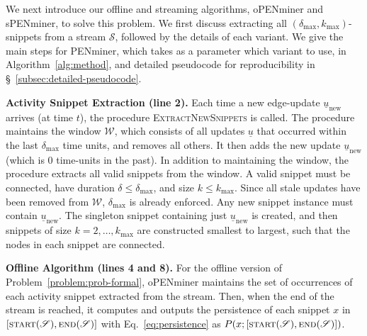 \documentclass[sigconf]{acmart}
\newcommand{\ul}{\underline}
\newcommand{\method}{PENminer\xspace}
\newcommand{\methodOffline}{oPENminer\xspace}
\newcommand{\methodOnline}{sPENminer\xspace}
\newcommand{\update}{\ul{u}}
\newcommand{\newUpdate}{\update_{\text{new}}}
\newcommand{\timestamp}{t}
\newcommand{\stream}{\mathscr{S}}
\newcommand{\streamStart}{\textsc{start}(\stream)}
\newcommand{\streamEnd}{\textsc{end}(\stream)}
\newcommand{\pattern}{x}
\newcommand{\patternSize}{k}
\newcommand{\duration}{\delta}
\newcommand{\window}{\mathscr{W}}
\newcommand{\maxDuration}{\duration_{\max}}
\newcommand{\maxSize}{\patternSize_{\max}}
\newcommand{\persistence}{P}
\begin{document}
We next introduce our offline and streaming algorithms, \methodOffline and \methodOnline, to solve this problem. 
We first discuss extracting all $(\maxDuration,\maxSize)$-snippets from a stream $\stream$, followed by the details of each variant.
We give the main steps for \method, which takes as a parameter which variant to use, in Algorithm~\ref{alg:method}, and detailed pseudocode for reproducibility in \S~\ref{subsec:detailed-pseudocode}.





\vspace{0.1cm}
\label{subsubsec:pattern-extraction}
\noindent \textbf{Activity Snippet Extraction (line 2).} \label{subsubsec:alg-extract-patterns} Each time a new edge-update $\newUpdate$ arrives (at time $\timestamp$), the procedure \textsc{ExtractNewSnippets} is called. The procedure maintains the window $\window$, which consists of all updates $\update$ 
that occurred within the last $\maxDuration$ time units, and removes all others. 
It then adds the new update $\newUpdate$ (which is 0 time-units in the past). In addition to maintaining the window, the procedure extracts all valid snippets from the window. A valid snippet must be connected, have duration $\duration \leq \maxDuration$, and size $\patternSize \leq \maxSize$.  Since all stale updates have been removed from $\window$, $\maxDuration$ is already enforced. Any new snippet instance must contain $\newUpdate$.  
The singleton snippet containing just $\newUpdate$ is created, and then snippets of size $\patternSize = 2, \dots, \maxSize$ are constructed smallest to largest, such that the nodes in each snippet are connected.



\vspace{0.1cm}
\noindent \textbf{Offline Algorithm (lines 4 and 8).}
\label{subsubsec:offline}
For the offline version of Problem~\ref{problem:prob-formal}, \methodOffline maintains the set of occurrences of each activity snippet extracted from the stream. Then, when the end of the stream is reached, it computes and outputs the persistence of each snippet $\pattern$ in $[\streamStart, \streamEnd]$ with Eq.~\eqref{eq:persistence} as $\persistence(\pattern;[\streamStart, \streamEnd])$.
\end{document}
